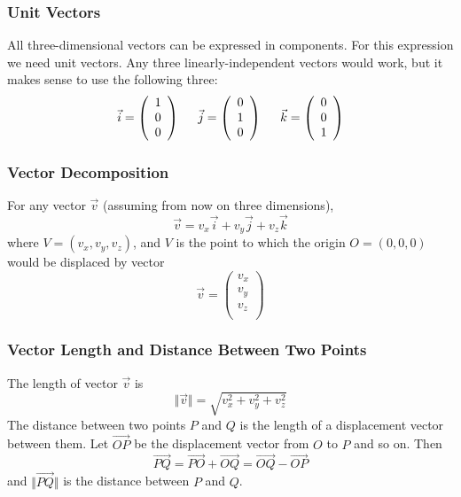 \documentclass[xcolor=dvipsnames]{beamer}
\begin{document}
\begin{frame}
  \frametitle{Unit Vectors}
  All three-dimensional vectors can be expressed in components. For
  this expression we need unit vectors. Any three linearly-independent
  vectors would work, but it makes sense to use the following three:
  \begin{equation}
    \label{eq:bahniech}
    \vec{i}=\left(
    \begin{array}{c}
      1 \\
      0 \\
      0
    \end{array}\right)\hspace{.2in}
    \vec{j}=\left(
    \begin{array}{c}
      0 \\
      1 \\
      0
    \end{array}\right)\hspace{.2in}
    \vec{k}=\left(
    \begin{array}{c}
      0 \\
      0 \\
      1
    \end{array}\right)
  \end{equation}
\end{frame}

\begin{frame}
  \frametitle{Vector Decomposition}
  For any vector $\vec{v}$  (assuming from now on three dimensions),
  \begin{equation}
    \label{eq:teequahg}
    \vec{v}=v_{x}\vec{i}+v_{y}\vec{j}+v_{z}\vec{k}
  \end{equation}
where $V=(v_{x},v_{y},v_{z})$, and $V$ is the point to which the
origin $O=(0,0,0)$ would be displaced by vector
\begin{equation}
  \label{eq:zaegiexo}
  \vec{v}=\left(
    \begin{array}{c}
      v_{x} \\
      v_{y} \\
      v_{z} \\
    \end{array}\right)
\end{equation}
\end{frame}

\begin{frame}
  \frametitle{Vector Length and Distance Between Two Points}
  The length of vector $\vec{v}$ is
  \begin{equation}
    \label{eq:ogeithie}
    \Vert\vec{v}\Vert=\sqrt{v_{x}^{2}+v_{y}^{2}+v_{z}^{2}}
  \end{equation}
The distance between two points $P$ and $Q$ is the length of a
displacement vector between them. Let $\vec{OP}$ be the displacement
vector from $O$ to $P$ and so on. Then
\begin{equation}
  \label{eq:ahnoocae}
  \vec{PQ}=\vec{PO}+\vec{OQ}=\vec{OQ}-\vec{OP}
\end{equation}
and $\Vert\vec{PQ}\Vert$ is the distance between $P$ and $Q$.
\end{frame}
\end{document}
